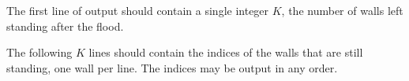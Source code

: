 The first line of output should contain a single integer $K$, the number of walls left standing after the flood.

The following $K$ lines should contain the indices of the walls that are still standing, one wall per line. The indices may be output in any order.